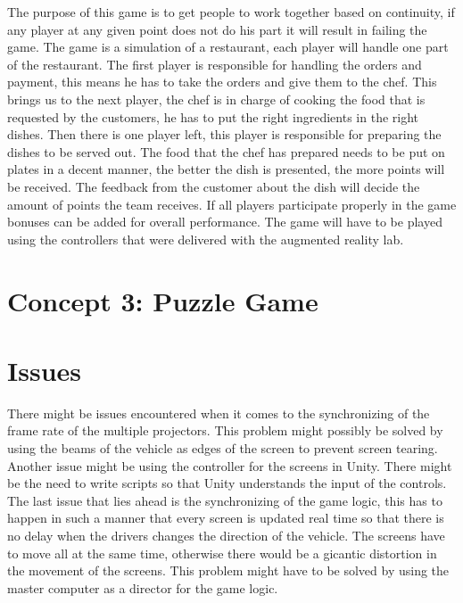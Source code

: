 \documentclass[10pt,a4paper]{article}
\begin{document}
The purpose of this game is to get people to work together based on continuity, if any player at any given point does not do his part it will result in failing the game. The game is a simulation of a restaurant, each player will handle one part of the restaurant. The first player is responsible for handling the orders and payment, this means he has to take the orders and give them to the chef. This brings us to the next player, the chef is in charge of cooking the food that is requested by the customers, he has to put the right ingredients in the right dishes. Then there is one player left, this player is responsible for preparing the dishes to be served out. The food that the chef has prepared needs to be put on plates in a decent manner, the better the dish is presented, the more points will be received. The feedback from the customer about the dish will decide the amount of points the team receives. If all players participate properly in the game bonuses can be added for overall performance. The game will have to be played using the controllers that were delivered with the augmented reality lab. 

\section{Concept 3: Puzzle Game}

\section{Issues}
There might be issues encountered when it comes to the synchronizing of the frame rate of the multiple projectors. This problem might possibly be solved by using the beams of the vehicle as edges of the screen to prevent screen tearing. Another issue might be using the controller for the screens in Unity. There might be the need to write scripts so that Unity understands the input of the controls. The last issue that lies ahead is the synchronizing of the game logic, this has to happen in such a manner that every screen is updated real time so that there is no delay when the drivers changes the direction of the vehicle. The screens have to move all at the same time, otherwise there would be a gicantic distortion in the movement of the screens. This problem might have to be solved by using the master computer as a director for the game logic.
\end{document}
